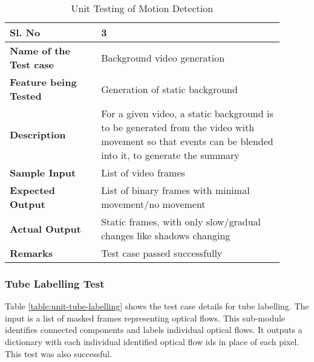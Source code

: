         \FloatBarrier
        \begin{table}[H]
            \begin{tabular}{|p{0.3\linewidth}|p{0.6\linewidth}|}
                \hline
                \textbf{Sl. No }              &\textbf{ 3}\\
                \hline
                \textbf{Name of the Test case}  & Background video generation \\
                \hline
                \textbf{Feature being Tested}  & Generation of static background \\
                \hline
                \textbf{Description}           & For a given video, a static background is to be generated from the video with movement so that events can be blended into it, to generate the summary \\
                \hline
                \textbf{Sample Input}          & List of video frames \\
                \hline
                \textbf{Expected Output}       & List of binary frames with minimal movement/no movement \\
                \hline
                \textbf{Actual Output}         & Static frames, with only slow/gradual changes like shadows changing \\
                \hline
                \textbf{Remarks }              & Test case passed successfully \\
                \hline
            \end{tabular}
            \caption{Unit Testing of Motion Detection}
            \label{table:unit-background-generation}
        \end{table}


        \subsubsection{Tube Labelling Test}

        Table \ref{table:unit-tube-labelling} shows the test case details for tube labelling. The input is a list of masked frames representing optical flows. This sub-module identifies connected components and labels individual optical flows. It outputs a dictionary with each individual identified optical flow ids in place of each pixel. This test was also successful.

